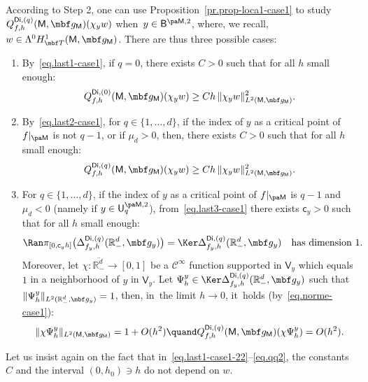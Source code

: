 According to Step 2, one can use Proposition~\ref{pr.prop-loca1-case1}
to study $Q_{f,h}^{\mathsf{Di},(q)}(\mathsf M,\mbf g_{\mathsf M})(\chi_y w)$ when~$y\in \mathsf B^{\pa \mathsf M,2}$, where, we
recall, $w\in \Lambda^0H^1_{\mbf T}(\mathsf M,\mbf g_{\mathsf M})$. There are thus three possible cases:
\begin{enumerate}
\item\label{step:31}
By~\eqref{eq.last1-case1}, if $q=0$, there exists $C>0$ such that for all $h$ small enough:
\begin{equation}\label{eq.last1-case1-22}
Q_{f,h}^{\mathsf{Di},(0)}(\mathsf M,\mbf g_{\mathsf M})(\chi_y w)\ge Ch\, \Vert \chi_y w \Vert_{L^2(\mathsf M,\mbf g_{\mathsf M})}^2.
\end{equation}
\item\label{step:32}
By~\eqref{eq.last2-case1}, for $q\in \{1,\ldots,d\}$, if the
index of $y$ as a critical point of $f|_{\pa \mathsf M}$ is not $q-1$, or if $\mu_{d}>0$, then, there exists $C>0$ such that for all $h$ small enough:
\begin{equation}\label{eq.qq2}
Q_{f,h}^{\mathsf{Di},(q)}(\mathsf M,\mbf g_{\mathsf M})(\chi_y w)\ge Ch\, \Vert\chi_y w \Vert_{L^2(\mathsf M,\mbf g_{\mathsf M})}^2.
\end{equation}

\item\label{step:33}
For $q\in \{1,\ldots,d\}$, if the index of $y$ as a critical point of
$f|_{\pa \mathsf M}$ is $q-1$ and $\mu_{d}<0$ (namely if $y \in \mathsf U^{\pa \mathsf M,2}_q$),
from~\eqref{eq.last3-case1} there exists $\mathsf c_y>0$ such that
for all $h$ small enough:
\begin{equation}\label{eq.span=11}
\Ran \pi_{[0,\mathsf c_yh]}\bigl(\Delta_{f_y,h}^{\mathsf{Di},(q)}(\mathbb R_-^d,\mbf g_y)\bigr)=\Ker \Delta_{f_y,h}^{\mathsf{Di},(q)}(\mathbb R_-^d,\mbf g_y)\quad \text{has dimension } 1.
\end{equation}
Moreover, let $\chi: \overline{\mathbb R^{d}_-}\to [0,1]$ be a $\mathcal C^\infty$ function supported in $\mathsf V_y$ which equals~$1$ in a neighborhood of $y$ in $\mathsf V_y$.
Let $\Psi_h^y\in \Ker \Delta_{f_y,h}^{\mathsf{Di},(q)}(\mathbb R_-^d,\mbf g_y)$ such that $\Vert \Psi_h^y \Vert_{L^2(\mathbb R^d_-,\mbf g_y)}=1$, then, in~the limit $h\to 0$, it~holds (by~\eqref{eq.norme-case1}):
\begin{equation}\label{eq.norme-case1-2}
\Vert \chi \Psi_h^y \Vert_{L^2(\mathsf M,\mbf g_{\mathsf M})} =1+O (h^{2}) \quand Q_{f,h}^{\mathsf{Di},(q)}(\mathsf M,\mbf g_{\mathsf M})(\chi \Psi_h^y)=O(h^2).
\end{equation}
\end{enumerate}
Let us insist again on the fact that in~\eqref{eq.last1-case1-22}--\eqref{eq.qq2}, the constants $C$
and the interval $(0,h_0) \ni h$ do not depend on $w$.

